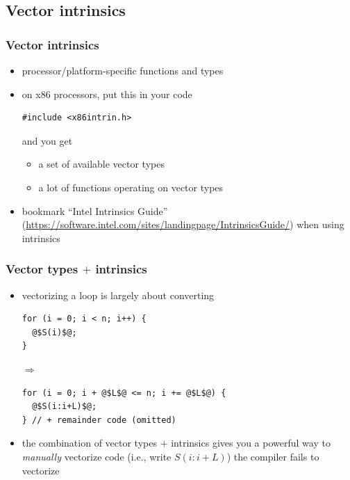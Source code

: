 \documentclass[12pt,dvipdfmx]{beamer}
\begin{document}
\subsection{Vector intrinsics}

\begin{frame}[fragile]
\frametitle{Vector intrinsics}
\begin{itemize}
\item processor/platform-specific functions and types
\item on x86 processors, put this in your code
\begin{lstlisting}
#include <x86intrin.h>
\end{lstlisting}
and you get
\begin{itemize}
\item a set of available vector types
\item a lot of functions operating on vector types
\end{itemize}

\item bookmark ``Intel Intrinsics Guide''
(\url{https://software.intel.com/sites/landingpage/IntrinsicsGuide/})
when using intrinsics
\end{itemize}
\end{frame}

\begin{frame}[fragile]
\frametitle{Vector types $+$ intrinsics}
\begin{itemize}
\item vectorizing a loop is largely about converting
\begin{lstlisting}
for (i = 0; i < n; i++) {
  @$S(i)$@;
}
\end{lstlisting}
$\Rightarrow$
\begin{lstlisting}
for (i = 0; i + @$L$@ <= n; i += @$L$@) {
  @$S(i:i+L)$@;
} // + remainder code (omitted)
\end{lstlisting}
\item the combination of vector types $+$ intrinsics gives
  you a powerful way to {\it manually} vectorize code
  (i.e., write $S(i:i+L)$) the compiler fails to vectorize
\end{itemize}
\end{frame}
\end{document}
